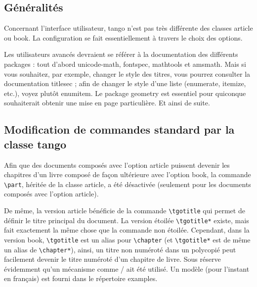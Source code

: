 \documentclass[french,ColorTheme=USAF,FontSize=10pt]{tango}
\newcommand\TO[1]{\textsf{#1}}
\begin{document}
\subsection{Généralités}
Concernant l'interface utilisateur, tango n'est pas très différente des classes \TO{article} ou \TO{book}. La configuration se fait essentiellement à travers le choix des options.

Les utilisateurs avancés devraient se référer à la documentation des différents packages : tout d'abord \TO{unicode-math}, \TO{fontspec}, \TO{mathtools} et \TO{amsmath}. Mais si vous souhaitez, par exemple, changer le style des titres, vous pourrez consulter la documentation \TO{titlesec} ; afin de changer le style d'une liste (enumerate, itemize, etc.), voyez plutôt \TO{enumitem}. Le package \TO{geometry} est essentiel pour quiconque souhaiterait obtenir une mise en page particulière. Et ainsi de suite. 



\subsection{Modification de commandes standard par la classe tango}

Afin que des documents composés avec l'option \TO{article} puissent devenir les chapitres d'un livre composé de façon ultérieure avec l'option \TO{book}, la commande   \verb+\part+, héritée de la classe  \TO{article}, a été désactivée (seulement pour les documents composés avec l'option \TO{article}).


De même, la version \TO{article} bénéficie de la commande \verb+\tgotitle+ qui permet de définir le titre principal du document. La version étoilée \verb+\tgotitle*+ existe, mais fait exactement la même chose que la commande non étoilée. Cependant, dans la version \TO{book}, \verb+\tgotitle+ est un alias pour \verb+\chapter+ (et \verb+\tgotitle*+ est de même un alias de \verb+\chapter*+), ainsi, un titre non numéroté dans un polycopié peut facilement devenir le titre numéroté d'un chapitre de livre. Sous réserve évidemment qu'un mécanisme comme \verb++/\verb++ ait été utilisé. Un modèle (pour l'instant en français) est fourni dans le répertoire \TO{examples}.  
\end{document}
